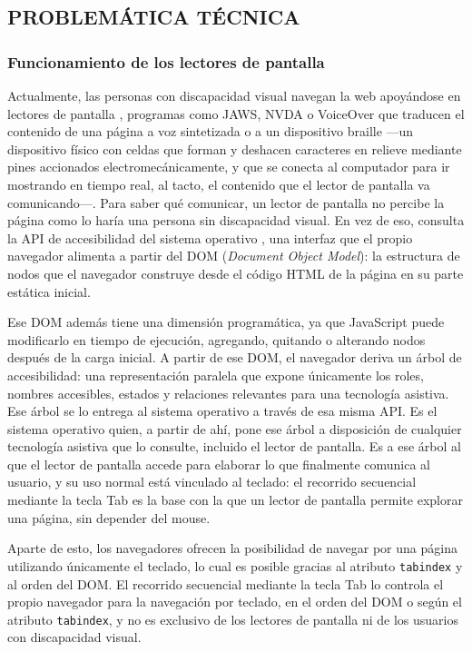 \subsection{PROBLEMÁTICA TÉCNICA}

\subsubsection{Funcionamiento de los lectores de pantalla}

Actualmente, las personas con discapacidad visual navegan la web apoyándose en lectores de pantalla \cite{w3ctoolstechniques}, programas como JAWS, NVDA o VoiceOver que traducen el contenido de una página a voz sintetizada o a un dispositivo braille —un dispositivo físico con celdas que forman y deshacen caracteres en relieve mediante pines accionados electromecánicamente, y que se conecta al computador para ir mostrando en tiempo real, al tacto, el contenido que el lector de pantalla va comunicando—. Para saber qué comunicar, un lector de pantalla no percibe la página como lo haría una persona sin discapacidad visual. En vez de eso, consulta la API de accesibilidad del sistema operativo \cite{mdn2024accessibilitytree}, una interfaz que el propio navegador alimenta a partir del DOM (\textit{Document Object Model}): la estructura de nodos que el navegador construye desde el código HTML de la página en su parte estática inicial.

Ese DOM además tiene una dimensión programática, ya que JavaScript puede modificarlo en tiempo de ejecución, agregando, quitando o alterando nodos después de la carga inicial. A partir de ese DOM, el navegador deriva un árbol de accesibilidad: una representación paralela que expone únicamente los roles, nombres accesibles, estados y relaciones relevantes para una tecnología asistiva. Ese árbol se lo entrega al sistema operativo a través de esa misma API. Es el sistema operativo quien, a partir de ahí, pone ese árbol a disposición de cualquier tecnología asistiva que lo consulte, incluido el lector de pantalla. Es a ese árbol al que el lector de pantalla accede para elaborar lo que finalmente comunica al usuario, y su uso normal está vinculado al teclado: el recorrido secuencial mediante la tecla Tab es la base con la que un lector de pantalla permite explorar una página, sin depender del mouse.

Aparte de esto, los navegadores ofrecen la posibilidad de navegar por una página utilizando únicamente el teclado, lo cual es posible gracias al atributo \texttt{tabindex} y al orden del DOM. El recorrido secuencial mediante la tecla Tab lo controla el propio navegador para la navegación por teclado, en el orden del DOM o según el atributo \texttt{tabindex}, y no es exclusivo de los lectores de pantalla ni de los usuarios con discapacidad visual.

